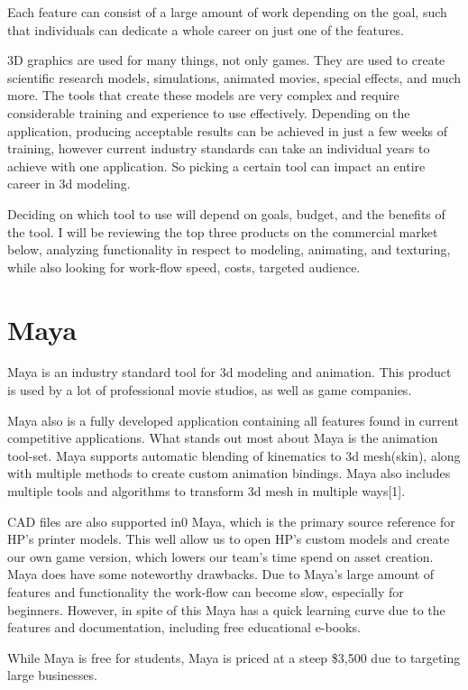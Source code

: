 \documentclass[onecolumn, draftclsnofoot,10pt, compsoc]{IEEEtran}
\begin{document}
Each feature can consist of a large amount of work depending on the goal, such that individuals can dedicate a whole career on just one of the features.

3D graphics are used for many things, not only games. They are used to create scientific research models, simulations, animated movies, special effects, and much more. The tools that create these models are very complex and require considerable training and experience to use effectively. Depending on the application, producing acceptable results can be achieved in just a few weeks of training, however current industry standards can take an individual years to achieve with one application. So picking a certain tool can impact an entire career in 3d modeling. 
 
Deciding on which tool to use will depend on goals, budget, and the benefits of the tool. I will be reviewing the top three products on the commercial market below, analyzing functionality in respect to modeling, animating, and texturing, while also looking for work-flow speed, costs, targeted audience.

\section{Maya}
Maya is an industry standard tool for 3d modeling and animation. This product is used by a lot of professional movie studios, as well as game companies. 

Maya also is a fully developed application containing all features found in current competitive applications. What stands out most about Maya is the animation tool-set. Maya supports automatic blending of kinematics to 3d mesh(skin), along with multiple methods to create custom animation bindings. Maya also includes multiple tools and algorithms to transform 3d mesh in multiple ways[1]. 

CAD files are also supported in0 Maya, which is the primary source reference for HP’s printer models. This well allow us to open HP’s custom models and create our own game version, which lowers our team’s time spend on asset creation. Maya does have some noteworthy drawbacks. Due to Maya’s large amount of features and functionality the work-flow can become slow, especially for beginners. However, in spite of this Maya has a quick learning curve due to the features and documentation, including free educational e-books.

While Maya is free for students, Maya is priced at a steep \$3,500 due to targeting large businesses.
\end{document}
